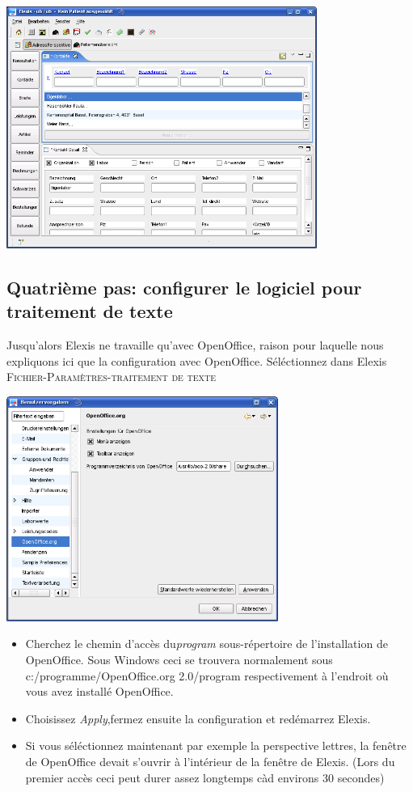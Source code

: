 \includegraphics[width=4in]{images/grundkonfmand1.png}
\subsection{Quatrième pas: configurer le logiciel pour traitement de texte}

Jusqu'alors Elexis ne travaille qu'avec OpenOffice, raison pour laquelle nous expliquons ici que la configuration avec  OpenOffice.
Séléctionnez dans Elexis \textsc{Fichier-Paramètres-traitement de texte}

\includegraphics[width=3.5in]{images/grundkonfmand2.png}

\begin{itemize}
 \item Cherchez le chemin d'accès du\textit{program} sous-répertoire de l'installation de OpenOffice. Sous Windows ceci se trouvera normalement sous c:/programme/OpenOffice.org 2.0/program  respectivement à l'endroit où vous avez installé OpenOffice.
 \item Choisissez \textit{Apply},fermez ensuite la configuration et redémarrez Elexis.
 \item Si vous séléctionnez maintenant par exemple la perspective lettres, la fenêtre de OpenOffice devait s'ouvrir à l'intérieur de la fenêtre de Elexis. (Lors du premier accès ceci peut durer assez longtemps càd environs 30 secondes)
\end{itemize}

